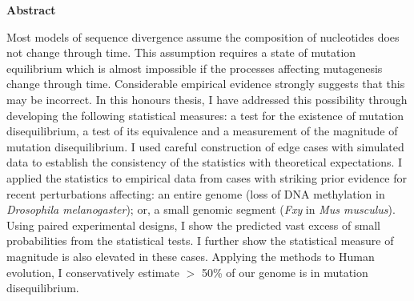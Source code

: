 \thispagestyle{plain}
\begin{center}
    
    \textbf{Abstract}
    
    Most models of sequence divergence assume the composition of nucleotides does not change through time. This assumption requires a state of mutation equilibrium which is almost impossible if the processes affecting mutagenesis change through time. Considerable empirical evidence strongly suggests that this may be incorrect. In this honours thesis, I have addressed this possibility through developing the following statistical measures: a test for the existence of mutation disequilibrium, a test of its equivalence and a measurement of the magnitude of mutation disequilibrium. I used careful construction of edge cases with simulated data to establish the consistency of the statistics with theoretical expectations. I applied the statistics to empirical data from cases with striking prior evidence for recent perturbations affecting: an entire genome (loss of DNA methylation in \textit{Drosophila melanogaster}); or, a small genomic segment (\textit{Fxy} in \textit{Mus musculus}). Using paired experimental designs, I show the predicted vast excess of small probabilities from the statistical tests. I further show the statistical measure of magnitude is also elevated in these cases. Applying the methods to Human evolution, I conservatively estimate $>$ 50\% of our genome is in mutation disequilibrium.


\end{center}